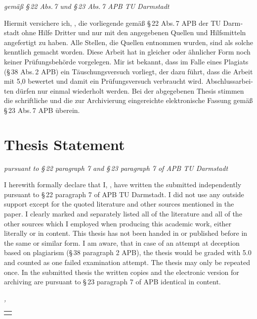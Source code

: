 


\begingroup

\begin{otherlanguage}{ngerman}
\begin{flushright}
	\emph{gemäß §\,22 Abs.\,7 und §\,23 Abs.\,7 APB TU Darmstadt}
\end{flushright}
Hiermit versichere ich, \myName{}, die vorliegende \myDegree{} gemäß §\,22 Abs.\,7 APB der TU Darmstadt ohne Hilfe Dritter und nur mit den angegebenen Quellen und Hilfsmitteln angefertigt zu haben. Alle Stellen, die Quellen entnommen wurden, sind als solche kenntlich gemacht worden. Diese Arbeit hat in gleicher oder ähnlicher Form noch keiner Prüfungsbehörde vorgelegen.
Mir ist bekannt, dass im Falle eines Plagiats (§\,38 Abs.\,2 APB) ein Täuschungsversuch vorliegt, der dazu führt, dass die Arbeit mit 5,0 bewertet und damit ein Prüfungsversuch verbraucht wird. Abschlussarbeiten dürfen nur einmal wiederholt werden.
Bei der abgegebenen Thesis stimmen die schriftliche und die zur Archivierung eingereichte elektronische Fassung gemäß §\,23 Abs.\,7 APB überein.
\end{otherlanguage}

\vfill

\let\cleardoublepage\relax
\chapter*{Thesis Statement}
\begin{flushright}
	\emph{pursuant to §\,22 paragraph 7 and §\,23 paragraph 7 of APB TU Darmstadt}
\end{flushright}

I herewith formally declare that I, \myName{}, have written the submitted \myDegree{} independently pursuant to §\,22 paragraph 7 of APB TU Darmstadt. I did not use any outside support except for the quoted literature and other sources mentioned in the paper. I clearly marked and separately listed all of the literature and all of the other sources which I employed when producing this academic work, either literally or in content. This thesis has not been handed in or published before in the same or similar form.
I am aware, that in case of an attempt at deception based on plagiarism (§\,38 paragraph 2 APB), the thesis would be graded with 5.0 and counted as one failed examination attempt. The thesis may only be repeated once.
In the submitted thesis the written copies and the electronic version for archiving are pursuant to §\,23 paragraph 7 of APB identical in content.

\vfill

\noindent\textit{\myLocation{}, \myTime{}}

\begin{flushright}
    \begin{tabular}{m{5cm}}
        \\ \hline
        \centering\myName{} \\
    \end{tabular}
\end{flushright}

\endgroup
